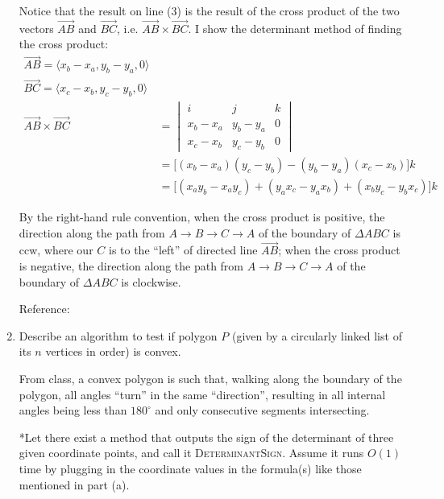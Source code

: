 \documentclass [12pt]{article}
\begin{document}
\begin{enumerate}[label=(\alph*)]
            Notice that the result on line (3) is the result of the cross product of the two vectors $\overrightarrow{AB}$ and $\overrightarrow{BC}$, i.e. $\overrightarrow{AB} \times \overrightarrow{BC}$. I show the determinant method of finding the cross product:
            \begin{align*}
                \overrightarrow{AB} = \langle x_b - x_a, y_b - y_a, 0 \rangle \\ 
                \overrightarrow{BC} = \langle x_c - x_b, y_c - y_b, 0 \rangle \\ 
                \overrightarrow{AB} \times \overrightarrow{BC} &= 
                \begin{vmatrix}
                    i & j & k \\
                    x_b - x_a & y_b - y_a & 0 \\ 
                    x_c - x_b & y_c - y_b & 0
                \end{vmatrix} \\
                &= \big[(x_b - x_a)(y_c - y_b) - (y_b - y_a)(x_c - x_b)\big] k \\ 
                &= \big[(x_a y_b - x_a y_c) + (y_a x_c - y_a x_b) + (x_b y_c - y_b x_c)\big] k
            \end{align*}
            
            
            By the right-hand rule convention, when the cross product is positive, the direction along the path from $A \rightarrow B \rightarrow C \rightarrow A$ of the boundary of $\Delta ABC$ is ccw, where our $C$ is to the ``left'' of directed line $\overrightarrow{AB}$; when the cross product is negative, the direction along the path from $A \rightarrow B \rightarrow C \rightarrow A$ of the boundary of $\Delta ABC$ is clockwise. 

            Reference: \cite{crossprod2vec} \cite{mathcurvorien}

            \item Describe an algorithm to test if polygon $P$ (given by a circularly linked list of its $n$ vertices in order) is convex. 
            
            From class, a convex polygon is such that, walking along the boundary of the polygon, all angles ``turn'' in the same ``direction'', resulting in all internal angles being less than $180^\circ$ and only consecutive segments intersecting.
            
            *Let there exist a method that outputs the sign of the determinant of three given coordinate points, and call it \textsc{DeterminantSign}. Assume it runs $O(1)$ time by plugging in the coordinate values in the formula(s) like those mentioned in part (a).
             

\end{enumerate}
\end{document}
